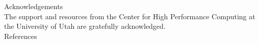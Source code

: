 \documentclass[aspectratio=169,xcolor=dvipsnames]{beamer}
\begin{document}

\begin{frame}
    \Large 
    Acknowledgements\\
    \vspace{5pt}
    \normalsize
    The support and resources from the Center for High Performance Computing at the University of Utah are gratefully acknowledged.\\
    \vspace{5pt}
    \Large
    References
    \normalsize
    
    
\end{frame}

\end{document}
